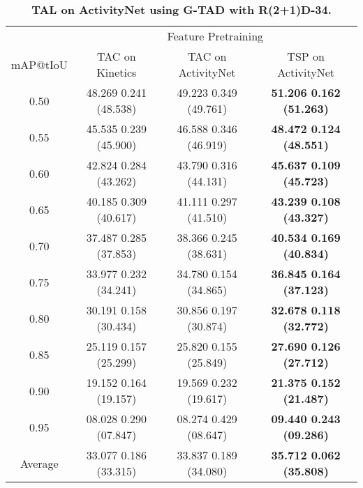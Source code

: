 \documentclass[10pt,twocolumn,letterpaper]{article}
\begin{document}
\begin{table*}[t]
\begin{subtable}{\linewidth}
    \centering
    \vspace{+5pt}
    \caption{\bf TAL on ActivityNet using G-TAD with R(2+1)D-34.}
    \vspace{-5pt}
    \begin{tabular}{c|ccc}
    \toprule 
            & \multicolumn{3}{c}{Feature Pretraining} \\ 
    mAP@tIoU& TAC on Kinetics                           & TAC on ActivityNet                        & TSP on ActivityNet \\ \midrule
    0.50    & 48.269 {\scriptsize  0.241} (48.538) & 49.223 {\scriptsize  0.349} (49.761) &\bf 51.206 {\scriptsize  0.162} (51.263) \\
    0.55    & 45.535 {\scriptsize  0.239} (45.900) & 46.588 {\scriptsize  0.346} (46.919) &\bf 48.472 {\scriptsize  0.124} (48.551) \\
    0.60    & 42.824 {\scriptsize  0.284} (43.262) & 43.790 {\scriptsize  0.316} (44.131) &\bf 45.637 {\scriptsize  0.109} (45.723) \\
    0.65    & 40.185 {\scriptsize  0.309} (40.617) & 41.111 {\scriptsize  0.297} (41.510) &\bf 43.239 {\scriptsize  0.108} (43.327) \\
    0.70    & 37.487 {\scriptsize  0.285} (37.853) & 38.366 {\scriptsize  0.245} (38.631) &\bf 40.534 {\scriptsize  0.169} (40.834) \\
    0.75    & 33.977 {\scriptsize  0.232} (34.241) & 34.780 {\scriptsize  0.154} (34.865) &\bf 36.845 {\scriptsize  0.164} (37.123) \\
    0.80    & 30.191 {\scriptsize  0.158} (30.434) & 30.856 {\scriptsize  0.197} (30.874) &\bf 32.678 {\scriptsize  0.118} (32.772) \\
    0.85    & 25.119 {\scriptsize  0.157} (25.299) & 25.820 {\scriptsize  0.155} (25.849) &\bf 27.690 {\scriptsize  0.126} (27.712) \\
    0.90    & 19.152 {\scriptsize  0.164} (19.157) & 19.569 {\scriptsize  0.232} (19.617) &\bf 21.375 {\scriptsize  0.152} (21.487) \\
    0.95    & 08.028 {\scriptsize  0.290} (07.847) & 08.274 {\scriptsize  0.429} (08.647) &\bf 09.440 {\scriptsize  0.243} (09.286) \\ \midrule
\rowcolor{Gray}
    Average & 33.077 {\scriptsize  0.186} (33.315) & 33.837 {\scriptsize  0.189} (34.080) &\bf 35.712 {\scriptsize  0.062} (35.808) \\
    \bottomrule
    \end{tabular}
\end{subtable}

\end{table*}
\end{document}
